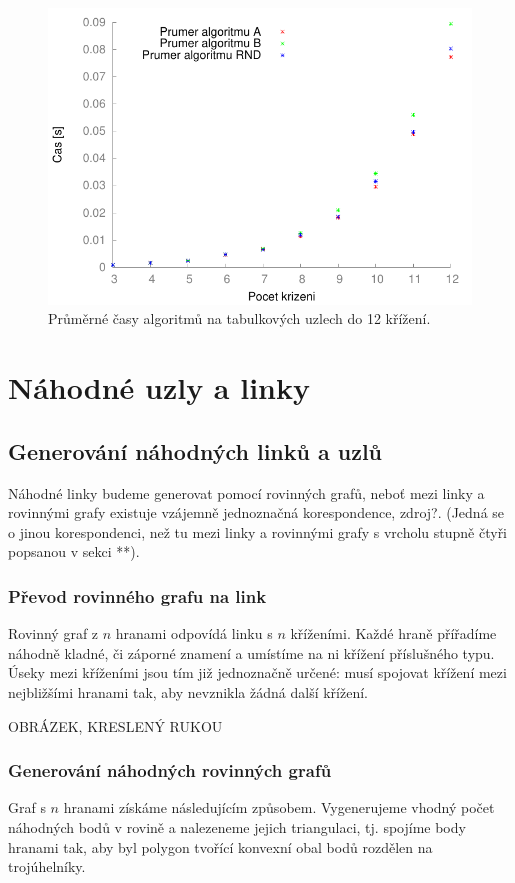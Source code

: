 \begin{figure}[p]\centering
\includegraphics{../img/srovTable}
\caption{Průměrné časy algoritmů na tabulkových uzlech do 12 křížení.}
\label{obr03:srovTable}
\end{figure}


\section{Náhodné uzly a linky}

\subsection{Generování náhodných linků a uzlů}
Náhodné linky budeme generovat pomocí rovinných grafů, neboť mezi linky a rovinnými grafy existuje vzájemně jednoznačná korespondence, zdroj?. (Jedná se o jinou korespondenci,  než tu mezi linky a rovinnými grafy s vrcholu stupně čtyři popsanou v sekci **).

\subsubsection{Převod rovinného grafu na link}
Rovinný graf z $n$ hranami odpovídá linku s $n$ kříženími. Každé hraně přířadíme náhodně kladné, či záporné znamení a umístíme na ni křížení příslušného typu. Úseky mezi kříženími jsou tím již jednoznačně určené: musí spojovat křížení mezi nejbližšími hranami tak, aby nevznikla žádná další křížení.

OBRÁZEK, KRESLENÝ RUKOU

\subsubsection{Generování náhodných rovinných grafů}
Graf s $n$ hranami získáme následujícím způsobem. Vygenerujeme vhodný počet náhodných bodů v rovině a nalezeneme jejich triangulaci, tj. spojíme body hranami tak, aby byl polygon tvořící konvexní obal bodů rozdělen na trojúhelníky.

